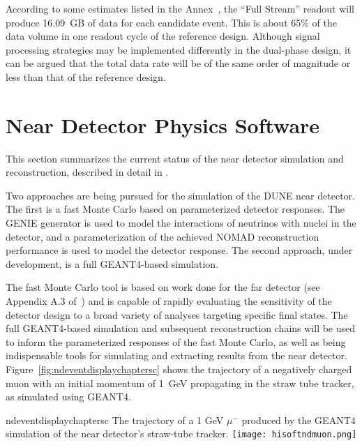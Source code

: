 According to some estimates listed in the Annex~\cite{cdr-annex-rates}, the ``Full Stream''
readout will produce 16.09~GB of data for each candidate event. This is
about 65\% of the data volume in one readout cycle of the reference
design.  Although signal processing strategies may be implemented
differently in the dual-phase design, it can be argued that the total
data rate will be of the same order of magnitude or less than that of the
reference design.

\section{Near Detector Physics Software}
\label{sec:detectors-sc-nd-physics-software}

This section summarizes the %
current status of the near detector
simulation and reconstruction, described in detail in \anxreco. %

Two approaches are being  pursued for the simulation of
the DUNE near detector.  The first is a fast Monte Carlo based on
parameterized detector responses. The GENIE\cite{GENIE} generator is
used to model the interactions of neutrinos with nuclei in the
detector, and a parameterization of the achieved NOMAD reconstruction
performance is used to model the detector response.  
The second
approach, under development, is a full GEANT4-based simulation. 
 
 The fast Monte Carlo tool is based on work done for the
far detector (see Appendix A.3 of~\cite{Adams:2013qkq}) and is capable of
rapidly evaluating the sensitivity of the detector design to a broad
variety of analyses targeting specific final states.  The full
GEANT4-based simulation and subsequent reconstruction chains will be
used to inform the parameterized responses of the fast Monte Carlo, as
well as being indispensable tools for simulating and extracting
results from the near detector.
Figure~\ref{fig:ndeventdisplaychaptersc} shows the trajectory of a
negatively charged muon with an initial momentum of 1~GeV propagating
in the straw tube tracker, as simulated using GEANT4.
\begin{cdrfigure}{ndeventdisplaychaptersc}
{The trajectory of a 1 GeV $\mu^-$ produced by the GEANT4 simulation of the near detector's straw-tube tracker.}
\texttt{[image: hisoftndmuon.png]}
\end{cdrfigure}

